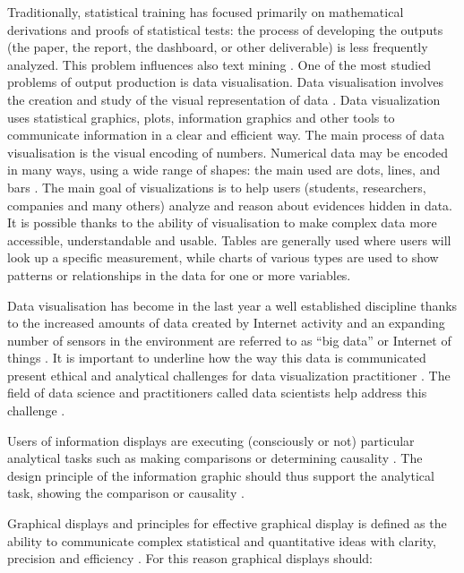 \documentclass[b5paper,]{book}
\theoremstyle{definition}
\theoremstyle{definition}
\theoremstyle{definition}
\theoremstyle{remark}
\begin{document}
Traditionally, statistical training has focused primarily on
mathematical derivations and proofs of statistical tests: the process of
developing the outputs (the paper, the report, the dashboard, or other
deliverable) is less frequently analyzed. This problem influences also
text mining \citep{parker2017opinionated}. One of the most studied
problems of output production is data visualisation. Data visualisation
involves the creation and study of the visual representation of data
\citep{friendly2001milestones}. Data visualization uses statistical
graphics, plots, information graphics and other tools to communicate
information in a clear and efficient way. The main process of data
visualisation is the visual encoding of numbers. Numerical data may be
encoded in many ways, using a wide range of shapes: the main used are
dots, lines, and bars \citep{wickham2016ggplot2}. The main goal of
visualizations is to help users (students, researchers, companies and
many others) analyze and reason about evidences hidden in data. It is
possible thanks to the ability of visualisation to make complex data
more accessible, understandable and usable. Tables are generally used
where users will look up a specific measurement, while charts of various
types are used to show patterns or relationships in the data for one or
more variables.

Data visualisation has become in the last year a well established
discipline thanks to the increased amounts of data created by Internet
activity and an expanding number of sensors in the environment are
referred to as ``big data'' or Internet of things
\citep{ertug2018editors}. It is important to underline how the way this
data is communicated present ethical and analytical challenges for data
visualization practitioner \citep{bikakis2018big}. The field of data
science and practitioners called data scientists help address this
challenge \citep{loukides2011data}.

Users of information displays are executing (consciously or not)
particular analytical tasks such as making comparisons or determining
causality \citep{tufte1990envisioning}. The design principle of the
information graphic should thus support the analytical task, showing the
comparison or causality \citep{tufte2006beautiful}.

Graphical displays and principles for effective graphical display is
defined as the ability to communicate complex statistical and
quantitative ideas with clarity, precision and efficiency
\citep{mulrow2002visual}. For this reason graphical displays should:
\end{document}
